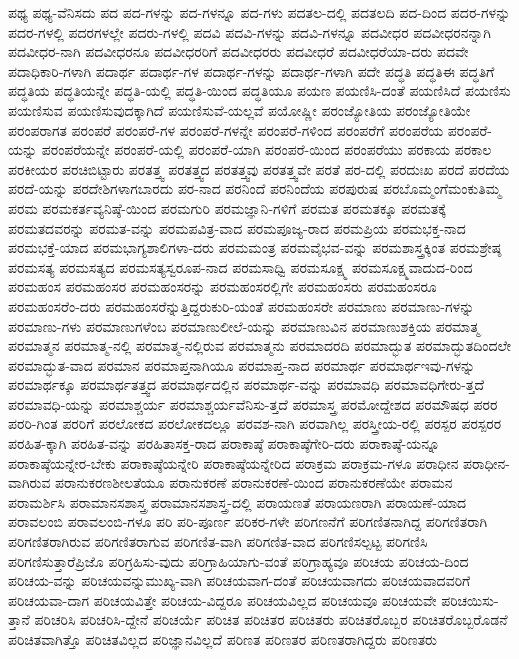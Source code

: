 {ಪಥ್ಯ
ಪಥ್ಯ-ವೆನಿಸದು
ಪದ
ಪದ-ಗಳನ್ನು
ಪದ-ಗಳನ್ನೂ
ಪದ-ಗಳು
ಪದತಲ-ದಲ್ಲಿ
ಪದತಲದಿ
ಪದ-ದಿಂದ
ಪದರ-ಗಳನ್ನು
ಪದರ-ಗಳಲ್ಲಿ
ಪದರಗಳಲ್ಲೇ
ಪದರು-ಗಳಲ್ಲಿ
ಪದವಿ
ಪದವಿ-ಗಳನ್ನು
ಪದವಿ-ಗಳನ್ನೂ
ಪದವೀಧರ
ಪದವೀಧರನನ್ನಾಗಿ
ಪದವೀಧರ-ನಾಗಿ
ಪದವೀಧರನೂ
ಪದವೀಧರರಿಗೆ
ಪದವೀಧರರು
ಪದವೀಧರೆ
ಪದವೀಧರೆಯಾ-ದರು
ಪದವೇ
ಪದಾಧಿಕಾರಿ-ಗಳಾಗಿ
ಪದಾರ್ಥ
ಪದಾರ್ಥ-ಗಳ
ಪದಾರ್ಥ-ಗಳನ್ನು
ಪದಾರ್ಥ-ಗಳಾಗಿ
ಪದೇ
ಪದ್ಧತಿ
ಪದ್ಧತಿಈ
ಪದ್ಧತಿಗೆ
ಪದ್ಧತಿಯ
ಪದ್ಧತಿಯನ್ನೇ
ಪದ್ಧತಿ-ಯಲ್ಲಿ
ಪದ್ಧತಿ-ಯಿಂದ
ಪದ್ಧತಿಯೂ
ಪಯಣ
ಪಯಣಿಸಿ-ದಂತೆ
ಪಯಣಿಸಿದೆ
ಪಯಣಿಸು
ಪಯಣಿಸುವ
ಪಯಣಿಸುವುದಕ್ಕಾಗಿದೆ
ಪಯಣಿಸುವೆ-ಯಲ್ಲವೆ
ಪಯೋಷ್ಣೀ
ಪರಂಜ್ಯೋತಿಯ
ಪರಂಜ್ಯೋತಿಯೇ
ಪರಂಪರಾಗತ
ಪರಂಪರೆ
ಪರಂಪರೆ-ಗಳ
ಪರಂಪರೆ-ಗಳನ್ನೇ
ಪರಂಪರೆ-ಗಳಿಂದ
ಪರಂಪರೆಗೆ
ಪರಂಪರೆಯ
ಪರಂಪರೆ-ಯನ್ನು
ಪರಂಪರೆಯನ್ನೇ
ಪರಂಪರೆ-ಯಲ್ಲಿ
ಪರಂಪರೆ-ಯಾಗಿ
ಪರಂಪರೆ-ಯಿಂದ
ಪರಂಪರೆಯು
ಪರಕಾಯ
ಪರಕಾಲ
ಪರಕೀಯರ
ಪರಚಿಬಿಟ್ಟಾರು
ಪರತತ್ತ್ವ
ಪರತತ್ತ್ವದ
ಪರತತ್ತ್ವವು
ಪರತತ್ತ್ವವೇ
ಪರತೆ
ಪರ-ದಲ್ಲಿ
ಪರದುಃಖ
ಪರದೆ
ಪರದೆಯ
ಪರದೆ-ಯನ್ನು
ಪರದೇಶಿಗಳಾಗಬಾರದು
ಪರ-ನಾದ
ಪರನಿಂದೆ
ಪರನಿಂದೆಯ
ಪರಪುರುಷ
ಪರಬೊಮ್ಮಂಗೆಮಂಕುತಿಮ್ಮ
ಪರಮ
ಪರಮಕರ್ತವ್ಯನಿಷ್ಠೆ-ಯಿಂದ
ಪರಮಗುರಿ
ಪರಮಜ್ಞಾನಿ-ಗಳಿಗೆ
ಪರಮತ
ಪರಮತಕ್ಕೂ
ಪರಮತಕ್ಕೆ
ಪರಮತದವರನ್ನು
ಪರಮತ-ವನ್ನು
ಪರಮಪವಿತ್ರ-ವಾದ
ಪರಮಪೂಜ್ಯ-ರಾದ
ಪರಮಪ್ರಿಯ
ಪರಮಭಕ್ತ-ನಾದ
ಪರಮಭಕ್ತೆ-ಯಾದ
ಪರಮಭಾಗ್ಯಶಾಲಿಗಳಾ-ದರು
ಪರಮಮಂತ್ರ
ಪರಮವೈಭವ-ವನ್ನು
ಪರಮಶಾಸ್ತ್ರಕ್ಕಿಂತ
ಪರಮಶ್ರೇಷ್ಠ
ಪರಮಸತ್ಯ
ಪರಮಸತ್ಯದ
ಪರಮಸತ್ಯಸ್ವರೂಪ-ನಾದ
ಪರಮಸಾಧ್ವಿ
ಪರಮಸೂಕ್ಷ್ಮ
ಪರಮಸೂಕ್ಷ್ಮವಾದುದ-ರಿಂದ
ಪರಮಹಂಸ
ಪರಮಹಂಸರ
ಪರಮಹಂಸರನ್ನು
ಪರಮಹಂಸರಲ್ಲಿಗೇ
ಪರಮಹಂಸರು
ಪರಮಹಂಸರೂ
ಪರಮಹಂಸರೆಂ-ದರು
ಪರಮಹಂಸರೆನ್ನುತ್ತಿದ್ದರುಕುರಿ-ಯಂತೆ
ಪರಮಹಂಸರೇ
ಪರಮಾಣು
ಪರಮಾಣು-ಗಳನ್ನು
ಪರಮಾಣು-ಗಳು
ಪರಮಾಣುಗಳೆಂಬ
ಪರಮಾಣುಲೀಲೆ-ಯನ್ನು
ಪರಮಾಣುವಿನ
ಪರಮಾಣುಶಕ್ತಿಯ
ಪರಮಾತ್ಮ
ಪರಮಾತ್ಮನ
ಪರಮಾತ್ಮ-ನಲ್ಲಿ
ಪರಮಾತ್ಮ-ನಲ್ಲಿರುವ
ಪರಮಾತ್ಮನು
ಪರಮಾದರದಿ
ಪರಮಾದ್ಭುತ
ಪರಮಾದ್ಭುತದಿಂದಲೇ
ಪರಮಾದ್ಭುತ-ವಾದ
ಪರಮಾನ
ಪರಮಾಪ್ತನಾಗಿಯೂ
ಪರಮಾಪ್ತ-ನಾದ
ಪರಮಾರ್ಥ
ಪರಮಾರ್ಥಇವು-ಗಳನ್ನು
ಪರಮಾರ್ಥಕ್ಕೂ
ಪರಮಾರ್ಥತತ್ತ್ವದ
ಪರಮಾರ್ಥದಲ್ಲಿನ
ಪರಮಾರ್ಥ-ವನ್ನು
ಪರಮಾವಧಿ
ಪರಮಾವಧಿಗೇರು-ತ್ತದೆ
ಪರಮಾವಧಿ-ಯನ್ನು
ಪರಮಾಶ್ಚರ್ಯ
ಪರಮಾಶ್ಚರ್ಯವೆನಿಸು-ತ್ತದೆ
ಪರಮಾಸ್ತ್ರ
ಪರಮೋದ್ದೇಶದ
ಪರಮೌಷಧ
ಪರರ
ಪರರಿ-ಗಿಂತ
ಪರರಿಗೆ
ಪರಲೋಕದ
ಪರಲೋಕದಲ್ಲೂ
ಪರವಶ-ನಾಗಿ
ಪರವಾಗಿಲ್ಲ
ಪರಸ್ತ್ರೀಯ-ರಲ್ಲಿ
ಪರಸ್ಪರ
ಪರಸ್ಪರರ
ಪರಹಿತ-ಕ್ಕಾಗಿ
ಪರಹಿತ-ವನ್ನು
ಪರಹಿತಾಸಕ್ತ-ರಾದ
ಪರಾಕಾಷ್ಠೆ
ಪರಾಕಾಷ್ಠೆಗೇರಿ-ದರು
ಪರಾಕಾಷ್ಠೆ-ಯನ್ನೂ
ಪರಾಕಾಷ್ಠೆಯನ್ನೇರ-ಬೇಕು
ಪರಾಕಾಷ್ಠೆಯನ್ನೇರಿ
ಪರಾಕಾಷ್ಠೆಯನ್ನೇರಿದ
ಪರಾಕ್ರಮ
ಪರಾಕ್ರಮ-ಗಳೂ
ಪರಾಧೀನ
ಪರಾಧೀನ-ವಾಗಿರುವ
ಪರಾನುಕರಣಶೀಲತೆಯೂ
ಪರಾನುಕರಣೆ
ಪರಾನುಕರಣೆ-ಯಿಂದ
ಪರಾನುಕರಣೆಯೇ
ಪರಾಮನ
ಪರಾಮರ್ಶಿಸಿ
ಪರಾಮಾನಸಶಾಸ್ತ್ರ
ಪರಾಮಾನಸಶಾಸ್ತ್ರ-ದಲ್ಲಿ
ಪರಾಯಣತೆ
ಪರಾಯಣರಾಗಿ
ಪರಾಯಣೆ-ಯಾದ
ಪರಾವಲಂಬಿ
ಪರಾವಲಂಬಿ-ಗಳೂ
ಪರಿ
ಪರಿ-ಪೂರ್ಣ
ಪರಿಕರ-ಗಳೇ
ಪರಿಗಣನೆಗೆ
ಪರಿಗಣಿತನಾಗಿದ್ದ
ಪರಿಗಣಿತರಾಗಿ
ಪರಿಗಣಿತರಾಗಿರುವ
ಪರಿಗಣಿತರಾಗುವ
ಪರಿಗಣಿತ-ವಾಗಿ
ಪರಿಗಣಿತ-ವಾದ
ಪರಿಗಣಿಸಲ್ಪಟ್ಟ
ಪರಿಗಣಿಸಿ
ಪರಿಗಣಿಸುತ್ತಾರೆಪ್ರಿಜೊ
ಪರಿಗ್ರಹಿಸು-ವುದು
ಪರಿಗ್ರಾಹಿಯಾಗು-ವಂತೆ
ಪರಿಗ್ರಾಹ್ಯವೂ
ಪರಿಚಯ
ಪರಿಚಯ-ದಿಂದ
ಪರಿಚಯ-ವನ್ನು
ಪರಿಚಯವನ್ನುಮುಖ್ಯ-ವಾಗಿ
ಪರಿಚಯವಾಗ-ದಂತೆ
ಪರಿಚಯವಾಗದು
ಪರಿಚಯವಾದವರಿಗೆ
ಪರಿಚಯವಾ-ದಾಗ
ಪರಿಚಯವಿತ್ತೇ
ಪರಿಚಯ-ವಿದ್ದರೂ
ಪರಿಚಯವಿಲ್ಲದ
ಪರಿಚಯವೂ
ಪರಿಚಯವೇ
ಪರಿಚಯಿಸು-ತ್ತಾನೆ
ಪರಿಚರಿಸಿ
ಪರಿಚರಿಸಿ-ದ್ದೇನೆ
ಪರಿಚರ್ಯೆ
ಪರಿಚಿತ
ಪರಿಚಿತರ
ಪರಿಚಿತರು
ಪರಿಚಿತರೊಬ್ಬರ
ಪರಿಚಿತರೊಬ್ಬರೊಡನೆ
ಪರಿಚಿತವಾಗಿತ್ತೊ
ಪರಿಚಿತವಿಲ್ಲದ
ಪರಿಜ್ಞಾನವಿಲ್ಲದೆ
ಪರಿಣತ
ಪರಿಣತರ
ಪರಿಣತರಾಗಿದ್ದರು
ಪರಿಣತರು
}
